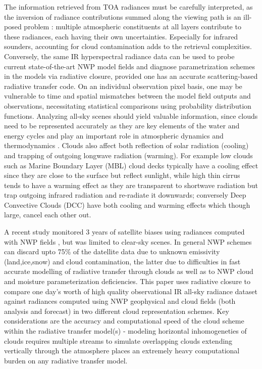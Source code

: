 \documentclass[agupp]{aguplus}              %
\begin{document}
\begin{article}
The information retrieved from TOA radiances must be carefully
interpreted, as the inversion of radiance contributions summed along
the viewing path is an ill-posed problem : multiple atmospheric
constituents at all layers contribute to these radiances, each having
their own uncertainties. Especially for infrared sounders, accounting
for cloud contamination adds to the retrieval complexities.
Conversely, the same IR hyperspectral radiance data can be used to
probe current state-of-the-art NWP model fields and diagnose
parametrization schemes in the models \citep{she:13} via radiative
closure, provided one has an accurate scattering-based radiative
transfer code. On an individual observation pixel basis, one may be
vulnerable to time and spatial mismatches between the model field
outputs and observations, necessitating statistical comparisons using
probability distribution functions.  Analyzing all-sky scenes should
yield valuable information, since clouds need to be represented
accurately as they are key elements of the water and energy cycles and
play an important role in atmospheric dynamics and thermodynamics
\citep{kok:11}. Clouds also affect both reflection of solar radiation
(cooling) and trapping of outgoing longwave radiation (warming).  For
example low clouds such as Marine Boundary Layer (MBL) cloud decks
typically have a cooling effect since they are close to the surface
but reflect sunlight, while high thin cirrus tends to have a warming
effect as they are transparent to shortwave radiation but trap
outgoing infrared radiation and re-radiate it downwards; conversely
Deep Convective Clouds (DCC) have both cooling and warming effects
which though large, cancel each other out.

A recent study monitored 3 years of satellite biases using radiances
computed with NWP fields \citep{sau:13}, but was limited to clear-sky
scenes. In general NWP schemes can discard upto 75\% of the datellite
data \cite{bau:10} due to unknown emissivity (land,ice,snow) and cloud
contamination, the latter due to difficulties in fast accurate
modelling of radiative transfer through clouds as well as to NWP cloud
and moisture parameterization deficiencies. This paper uses radiative
closure to compare one day's worth of high quality observational IR
all-sky radiance dataset against radiances computed using NWP
geophysical and cloud fields (both analysis and forecast) in two
different cloud representation schemes. Key considerations are the
accuracy and computational speed of the cloud scheme within the
radiative transfer model(s) - modeling horizontal inhomogeneties of
clouds requires multiple streams to simulate overlapping clouds
extending vertically through the atmosphere places an extremely heavy
computational burden on any radiative transfer model.


\end{article}
\end{document}
